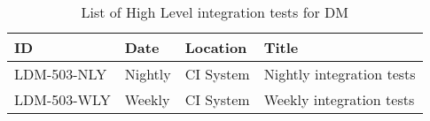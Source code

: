 \begin{longtable} {lllp{}}
\caption{List of High Level integration tests for DM \label{tab:schedule}} \\ %
\hline
\textbf{ID} & \textbf{Date} & \textbf{Location} & \textbf{Title} \\ \hline

LDM-503-NLY &
Nightly &
CI System &
Nightly integration tests \\

LDM-503-WLY &
Weekly &
CI System &
Weekly integration tests \\


\hline

\end{longtable}
